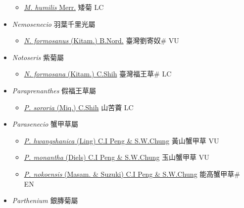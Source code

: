 \begin{itemize}
  \begin{itemize}
        \item[] \href{http://www.theplantlist.org/tpl1.1/search?q=Myriactis+humilis}{\textit{M. humilis} Merr.}   矮菊 LC
  \end{itemize}
 \item[] \textit{Nemosenecio} 羽葉千里光屬
                    
  \begin{itemize}
        \item[] \href{http://www.theplantlist.org/tpl1.1/search?q=Nemosenecio+formosanus}{\textit{N. formosanus} (Kitam.) B.Nord.}   臺灣劉寄奴\# VU
  \end{itemize}
 \item[] \textit{Notoseris} 紫菊屬
                    
  \begin{itemize}
        \item[] \href{http://www.theplantlist.org/tpl1.1/search?q=Notoseris+formosana}{\textit{N. formosana} (Kitam.) C.Shih}   臺灣福王草\# LC
  \end{itemize}
 \item[] \textit{Paraprenanthes} 假福王草屬
                    
  \begin{itemize}
        \item[] \href{http://www.theplantlist.org/tpl1.1/search?q=Paraprenanthes+sororia}{\textit{P. sororia} (Miq.) C.Shih}   山苦藚 LC
  \end{itemize}
 \item[] \textit{Parasenecio} 蟹甲草屬
                    
  \begin{itemize}
        \item[] \href{http://www.theplantlist.org/tpl1.1/search?q=Parasenecio+hwangshanica}{\textit{P. hwangshanica} (Ling) C.I Peng \& S.W.Chung}   黃山蟹甲草 VU
        \item[] \href{http://www.theplantlist.org/tpl1.1/search?q=Parasenecio+monantha}{\textit{P. monantha} (Diels) C.I Peng \& S.W.Chung}   玉山蟹甲草 VU
        \item[] \href{http://www.theplantlist.org/tpl1.1/search?q=Parasenecio+nokoensis}{\textit{P. nokoensis} (Masam. \& Suzuki) C.I Peng \& S.W.Chung}   能高蟹甲草\# EN
  \end{itemize}
 \item[] \textit{Parthenium} 銀膞菊屬
                    

\end{itemize}
